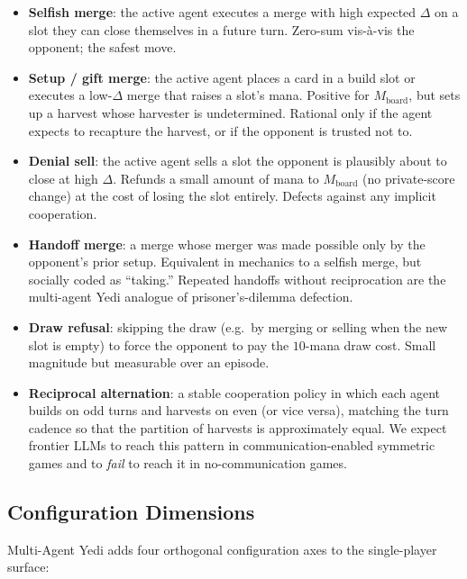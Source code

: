 \documentclass[11pt]{article}
\begin{document}
\begin{itemize}
  \item \textbf{Selfish merge}: the active agent executes a merge
    with high expected $\Delta$ on a slot they can close themselves in
    a future turn. Zero-sum vis-\`a-vis the opponent; the safest
    move.
  \item \textbf{Setup / gift merge}: the active agent places a card in a
    build slot or executes a low-$\Delta$ merge that raises a slot's
    mana. Positive for $M_\text{board}$, but sets up a harvest whose
    harvester is undetermined. Rational only if the agent expects to
    recapture the harvest, or if the opponent is trusted not to.
  \item \textbf{Denial sell}: the active agent sells a slot the opponent
    is plausibly about to close at high $\Delta$. Refunds a small
    amount of mana to $M_\text{board}$ (no private-score change) at the
    cost of losing the slot entirely. Defects against any implicit
    cooperation.
  \item \textbf{Handoff merge}: a merge whose merger was made possible
    only by the opponent's prior setup. Equivalent in mechanics to a
    selfish merge, but socially coded as ``taking.'' Repeated handoffs
    without reciprocation are the multi-agent Yedi analogue of
    prisoner's-dilemma defection.
  \item \textbf{Draw refusal}: skipping the draw (e.g.\ by merging or
    selling when the new slot is empty) to force the opponent to pay
    the $10$-mana draw cost. Small magnitude but measurable over an
    episode.
  \item \textbf{Reciprocal alternation}: a stable cooperation policy in
    which each agent builds on odd turns and harvests on even (or
    vice versa), matching the turn cadence so that the partition of
    harvests is approximately equal. We expect frontier LLMs to reach
    this pattern in communication-enabled symmetric games and to
    \emph{fail} to reach it in no-communication games.
\end{itemize}

\subsection{Configuration Dimensions}
\label{sec:ma-configs}

Multi-Agent Yedi adds four orthogonal configuration axes to the
single-player surface:
\end{document}
